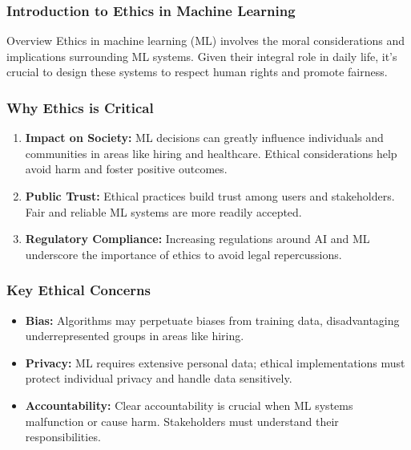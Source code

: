\documentclass[aspectratio=169]{beamer}
\begin{document}
\frame{\titlepage}

\begin{frame}[fragile]
    \frametitle{Introduction to Ethics in Machine Learning}
    \begin{block}{Overview}
        Ethics in machine learning (ML) involves the moral considerations and implications surrounding ML systems. Given their integral role in daily life, it's crucial to design these systems to respect human rights and promote fairness.
    \end{block}
\end{frame}

\begin{frame}[fragile]
    \frametitle{Why Ethics is Critical}
    \begin{enumerate}
        \item \textbf{Impact on Society:} ML decisions can greatly influence individuals and communities in areas like hiring and healthcare. Ethical considerations help avoid harm and foster positive outcomes.
        \item \textbf{Public Trust:} Ethical practices build trust among users and stakeholders. Fair and reliable ML systems are more readily accepted.
        \item \textbf{Regulatory Compliance:} Increasing regulations around AI and ML underscore the importance of ethics to avoid legal repercussions.
    \end{enumerate}
\end{frame}

\begin{frame}[fragile]
    \frametitle{Key Ethical Concerns}
    \begin{itemize}
        \item \textbf{Bias:} Algorithms may perpetuate biases from training data, disadvantaging underrepresented groups in areas like hiring.
        \item \textbf{Privacy:} ML requires extensive personal data; ethical implementations must protect individual privacy and handle data sensitively.
        \item \textbf{Accountability:} Clear accountability is crucial when ML systems malfunction or cause harm. Stakeholders must understand their responsibilities.
    \end{itemize}
\end{frame}
\end{document}
